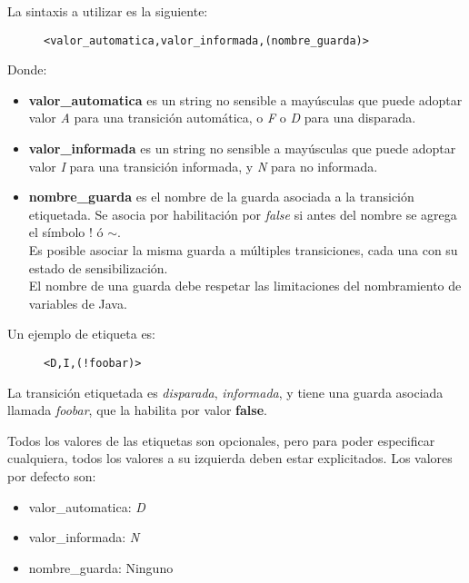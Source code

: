 La sintaxis a utilizar es la siguiente:

\begin{figure}[H]
\centering
\begin{verbatim}
<valor_automatica,valor_informada,(nombre_guarda)>
\end{verbatim}
\end{figure}

Donde:
\begin{itemize}
    \item \textbf{valor\_automatica} es un string no sensible a mayúsculas que
    puede adoptar valor \textit{A} para una transición automática, o
    \textit{F} o \textit{D} para una disparada.
    \item \textbf{valor\_informada} es un string no sensible a mayúsculas que
    puede adoptar valor \textit{I} para una transición informada, y
    \textit{N} para no informada.
    \item \textbf{nombre\_guarda} es el nombre de la guarda asociada a la
    transición etiquetada. Se asocia por habilitación por \textit{false}
    si antes del nombre se agrega el símbolo $!$ ó $\mathtt{\sim}$.\\
    Es posible asociar la misma guarda a múltiples transiciones, cada una con
    su estado de sensibilización.\\
    El nombre de una guarda debe respetar las limitaciones del nombramiento de
    variables de Java.
\end{itemize}

Un ejemplo de etiqueta es:

\begin{figure}[H]
\centering
\begin{verbatim}
<D,I,(!foobar)>
\end{verbatim}
\end{figure}

La transición etiquetada es \textit{disparada}, \textit{informada}, y tiene una
guarda asociada llamada \textit{foobar}, que la habilita por valor \textbf{false}.

Todos los valores de las etiquetas son opcionales, pero para poder especificar
cualquiera, todos los valores a su izquierda deben estar explicitados. Los
valores por defecto son:
\begin{itemize}
    \item valor\_automatica: \textit{D}
    \item valor\_informada: \textit{N}
    \item nombre\_guarda: Ninguno
\end{itemize}

